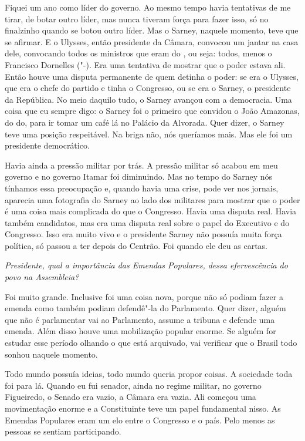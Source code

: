 Fiquei um ano como líder do governo. Ao mesmo tempo havia tentativas de
me tirar, de botar outro líder, mas nunca tiveram força para fazer isso,
só no finalzinho quando se botou outro líder. Mas o Sarney, naquele
momento, teve que se afirmar. E o Ulysses, então presidente da Câmara,
convocou um jantar na casa dele, convocando todos os ministros que eram
do , ou seja: todos, menos o Francisco Dornelles ("-). Era uma
tentativa de mostrar que o poder estava ali. Então houve uma disputa
permanente de quem detinha o poder: se era o Ulysses, que era o chefe do
partido e tinha o Congresso, ou se era o Sarney, o presidente da
República. No meio daquilo tudo, o Sarney avançou com a democracia. Uma
coisa que eu sempre digo: o Sarney foi o primeiro que convidou o João
Amazonas, do do, para ir tomar um café lá no Palácio da Alvorada.
Quer dizer, o Sarney teve uma posição respeitável. Na briga não, nós
queríamos mais. Mas ele foi um presidente democrático.

Havia ainda a pressão militar por trás. A pressão militar só acabou em
meu governo e no governo Itamar foi diminuindo. Mas no tempo do Sarney
nós tínhamos essa preocupação e, quando havia uma crise, pode ver nos
jornais, aparecia uma fotografia do Sarney ao lado dos militares para
mostrar que o poder é uma coisa mais complicada do que o Congresso.
Havia uma disputa real. Havia também candidatos, mas era uma disputa
real sobre o papel do Executivo e do Congresso. Isso era muito vivo e o
presidente Sarney não possuía muita força política, só passou a ter
depois do Centrão. Foi quando ele deu as cartas.

\medskip

\noindent\emph{Presidente, qual a importância das Emendas Populares, dessa
efervescência do povo na Assembleia? }

Foi muito grande. Inclusive foi uma coisa nova, porque não
só podiam fazer a emenda como também podiam defendê"-la do Parlamento.
Quer dizer, alguém que não é parlamentar vai ao Parlamento, assume a
tribuna e defende uma emenda. Além disso houve uma mobilização popular
enorme. Se alguém for estudar esse período olhando o que está arquivado,
vai verificar que o Brasil todo sonhou naquele momento.

Todo mundo possuía ideias, todo mundo queria propor coisas. A sociedade
toda foi para lá. Quando eu fui senador, ainda no regime militar, no
governo Figueiredo, o Senado era vazio, a Câmara era vazia. Ali começou
uma movimentação enorme e a Constituinte teve um papel fundamental
nisso. As Emendas Populares eram um elo entre o Congresso e o país. Pelo
menos as pessoas se sentiam participando.

